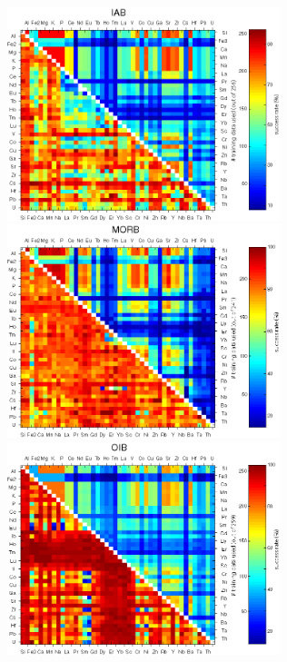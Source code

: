 \begin{figure}[htbp]
  \centering
  \includegraphics[width=300]{figures/xPlotTrace3Ti_quadratic_IAB.jpg}
  \includegraphics[width=300]{figures/xPlotTrace3Ti_quadratic_MORB.jpg}\\
  \includegraphics[width=300]{figures/xPlotTrace3Ti_quadratic_OIB.jpg}

\end{figure}
